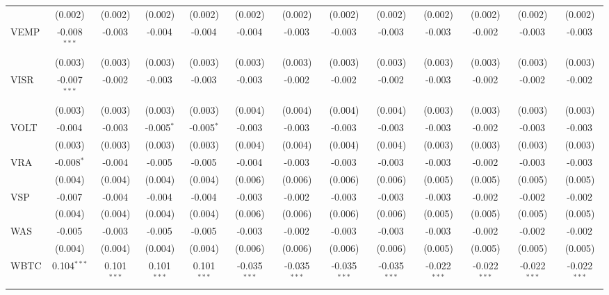 \begin{table}[!htbp]
\begin{tabular}{@{\extracolsep{5pt}}lcccccccccccc}
  & (0.002) & (0.002) & (0.002) & (0.002) & (0.002) & (0.002) & (0.002) & (0.002) & (0.002) & (0.002) & (0.002) & (0.002) \\
 VEMP & -0.008$^{***}$ & -0.003$^{}$ & -0.004$^{}$ & -0.004$^{}$ & -0.004$^{}$ & -0.003$^{}$ & -0.003$^{}$ & -0.003$^{}$ & -0.003$^{}$ & -0.002$^{}$ & -0.003$^{}$ & -0.003$^{}$ \\
  & (0.003) & (0.003) & (0.003) & (0.003) & (0.003) & (0.003) & (0.003) & (0.003) & (0.003) & (0.003) & (0.003) & (0.003) \\
 VISR & -0.007$^{***}$ & -0.002$^{}$ & -0.003$^{}$ & -0.003$^{}$ & -0.003$^{}$ & -0.002$^{}$ & -0.002$^{}$ & -0.002$^{}$ & -0.003$^{}$ & -0.002$^{}$ & -0.002$^{}$ & -0.002$^{}$ \\
  & (0.003) & (0.003) & (0.003) & (0.003) & (0.004) & (0.004) & (0.004) & (0.004) & (0.003) & (0.003) & (0.003) & (0.003) \\
 VOLT & -0.004$^{}$ & -0.003$^{}$ & -0.005$^{*}$ & -0.005$^{*}$ & -0.003$^{}$ & -0.003$^{}$ & -0.003$^{}$ & -0.003$^{}$ & -0.003$^{}$ & -0.002$^{}$ & -0.003$^{}$ & -0.003$^{}$ \\
  & (0.003) & (0.003) & (0.003) & (0.003) & (0.004) & (0.004) & (0.004) & (0.004) & (0.003) & (0.003) & (0.003) & (0.003) \\
 VRA & -0.008$^{*}$ & -0.004$^{}$ & -0.005$^{}$ & -0.005$^{}$ & -0.004$^{}$ & -0.003$^{}$ & -0.003$^{}$ & -0.003$^{}$ & -0.003$^{}$ & -0.002$^{}$ & -0.003$^{}$ & -0.003$^{}$ \\
  & (0.004) & (0.004) & (0.004) & (0.004) & (0.006) & (0.006) & (0.006) & (0.006) & (0.005) & (0.005) & (0.005) & (0.005) \\
 VSP & -0.007$^{}$ & -0.004$^{}$ & -0.004$^{}$ & -0.004$^{}$ & -0.003$^{}$ & -0.002$^{}$ & -0.003$^{}$ & -0.003$^{}$ & -0.003$^{}$ & -0.002$^{}$ & -0.002$^{}$ & -0.002$^{}$ \\
  & (0.004) & (0.004) & (0.004) & (0.004) & (0.006) & (0.006) & (0.006) & (0.006) & (0.005) & (0.005) & (0.005) & (0.005) \\
 WAS & -0.005$^{}$ & -0.003$^{}$ & -0.005$^{}$ & -0.005$^{}$ & -0.003$^{}$ & -0.002$^{}$ & -0.003$^{}$ & -0.003$^{}$ & -0.003$^{}$ & -0.002$^{}$ & -0.002$^{}$ & -0.002$^{}$ \\
  & (0.004) & (0.004) & (0.004) & (0.004) & (0.006) & (0.006) & (0.006) & (0.006) & (0.005) & (0.005) & (0.005) & (0.005) \\
 WBTC & 0.104$^{***}$ & 0.101$^{***}$ & 0.101$^{***}$ & 0.101$^{***}$ & -0.035$^{***}$ & -0.035$^{***}$ & -0.035$^{***}$ & -0.035$^{***}$ & -0.022$^{***}$ & -0.022$^{***}$ & -0.022$^{***}$ & -0.022$^{***}$ \\

\end{tabular}
\end{table}
